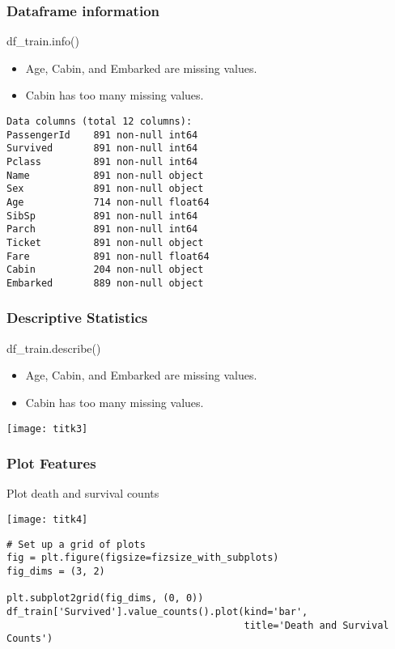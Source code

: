 \begin{frame}[fragile]\frametitle{Dataframe information}
df\_train.info()

\begin{itemize}
\item Age, Cabin, and Embarked are missing values. 
\item Cabin has too many missing values.
\end{itemize}

\begin{lstlisting}
Data columns (total 12 columns):
PassengerId    891 non-null int64
Survived       891 non-null int64
Pclass         891 non-null int64
Name           891 non-null object
Sex            891 non-null object
Age            714 non-null float64
SibSp          891 non-null int64
Parch          891 non-null int64
Ticket         891 non-null object
Fare           891 non-null float64
Cabin          204 non-null object
Embarked       889 non-null object
\end{lstlisting}

\end{frame}


\begin{frame}[fragile]\frametitle{Descriptive Statistics}
df\_train.describe()
\begin{itemize}
\item Age, Cabin, and Embarked are missing values. 
\item Cabin has too many missing values.
\end{itemize}
\begin{center}
\texttt{[image: titk3]}
\end{center}
\end{frame}

\begin{frame}[fragile]\frametitle{Plot Features}
Plot death and survival counts

\begin{center}
\texttt{[image: titk4]}
\end{center}

\begin{lstlisting}
# Set up a grid of plots
fig = plt.figure(figsize=fizsize_with_subplots) 
fig_dims = (3, 2)

plt.subplot2grid(fig_dims, (0, 0))
df_train['Survived'].value_counts().plot(kind='bar', 
                                         title='Death and Survival Counts')
\end{lstlisting}

\end{frame}

